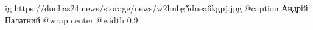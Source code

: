  
 
 
 
 

\ifcmt
  ig https://donbas24.news/storage/news/w2lmbg5dnea6kgpj.jpg
	@caption Андрій Палатний
  @wrap center
  @width 0.9
\fi
